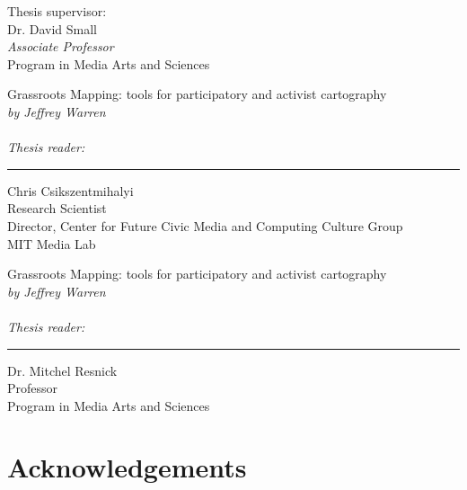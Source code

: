 \documentclass[11pt,oneside,notitlepage]{report}
\begin{document}
\vspace{20px}
\large{
Thesis supervisor:\\
Dr. David Small\\
\emph{Associate Professor}\\
Program in Media Arts and Sciences\\
}

\pagebreak
\vspace{100px}
\Large{Grassroots Mapping: tools for participatory and activist cartography \vspace{10px} \\ 
\emph{by Jeffrey Warren}\vspace{400px} \\ 
\vspace{10px}\\
\large{\emph{Thesis reader: }}\\
\hrule \vspace{10px}
\begin{flushright}
Chris Csikszentmihalyi\\
Research Scientist\\
Director, Center for Future Civic Media and Computing Culture Group\\
MIT Media Lab\\
\end{flushright}

\pagebreak
\vspace{100px}
\Large{Grassroots Mapping: tools for participatory and activist cartography \vspace{10px} \\ 
\emph{by Jeffrey Warren}\vspace{400px} \\ 
\vspace{10px}\\
\large{\emph{Thesis reader: }}\\
\hrule \vspace{10px}
\begin{flushright}
Dr. Mitchel Resnick\\
Professor\\
Program in Media Arts and Sciences
\end{flushright}

\pagebreak
\normalsize{
\section*{Acknowledgements}
}

}}
\end{document}
